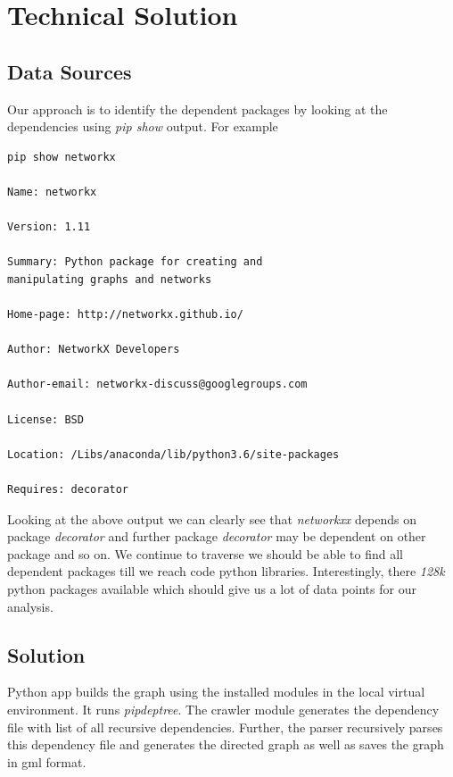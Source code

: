 \section{Technical Solution} \label{techsoln}

\subsection{Data Sources} \label{datasources}
 Our approach is to identify the dependent packages by looking
 at the dependencies using \textit{pip show} output. For example
 \begin{verbatim}
pip show networkx

Name: networkx

Version: 1.11

Summary: Python package for creating and 
manipulating graphs and networks

Home-page: http://networkx.github.io/

Author: NetworkX Developers

Author-email: networkx-discuss@googlegroups.com

License: BSD

Location: /Libs/anaconda/lib/python3.6/site-packages

Requires: decorator
 \end{verbatim}
 Looking at the above output we can clearly see that \textit{networkxx}
 depends on package \textit{decorator} and further package \textit{decorator}
 may be dependent on other package and so on. We continue to traverse
 we should be able to find all dependent packages till we reach code python
 libraries. Interestingly, there \textit{128k} python packages available
 \cite{www-python-org} which should give us a lot of data points for our
 analysis.

\subsection{Solution} \label{automation}
 Python app builds the graph using the installed modules in the local virtual
 environment. It runs \textit{pipdeptree}. The crawler module generates the
 dependency file with list of all recursive dependencies. Further, the parser recursively
 parses this dependency file and generates the directed graph as well as saves the
 graph in gml format. 
 
